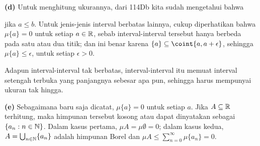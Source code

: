 {\medskip

{\bf (d)} Untuk menghitung ukurannya, dari 114Db kita sudah mengetahui
bahwa


\noindent jika $a\le b$. Untuk jenis-jenis interval berbatas lainnya,
cukup diperhatikan bahwa $\mu\{a\}=0$ untuk setiap $a\in\Bbb R$, sebab
interval-interval tersebut hanya berbeda pada satu atau dua titik; dan
ini benar karena $\{a\}\subseteq\coint{a,a+\epsilon}$,
sehingga $\mu\{a\}\le\epsilon$, untuk setiap $\epsilon>0$.

Adapun interval-interval tak berbatas, interval-interval itu memuat
interval setengah terbuka yang panjangnya sebesar apa pun, sehingga
harus mempunyai ukuran tak hingga.

\medskip

{\bf (e)} Sebagaimana baru saja dicatat, $\mu\{a\}=0$ untuk setiap
$a$. Jika $A\subseteq\Bbb R$ terhitung, maka himpunan tersebut kosong
atau dapat dinyatakan sebagai $\{a_n:n\in\Bbb N\}$. Dalam kasus pertama,
$\mu A=\mu\emptyset=0$; dalam kasus kedua,
$A=\bigcup_{n\in\Bbb N}\{a_n\}$ adalah himpunan Borel dan
$\mu A\le\sum_{n=0}^{\infty}\mu\{a_n\}=0$.
}%


